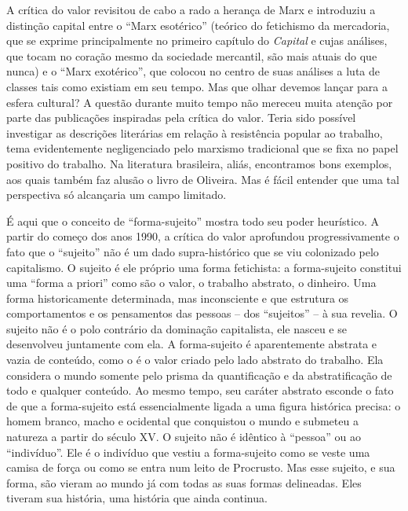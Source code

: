 A crítica do valor revisitou de cabo a rado a herança de Marx e
introduziu a distinção capital entre o ``Marx esotérico'' (teórico do
fetichismo da mercadoria, que se exprime principalmente no primeiro
capítulo do \emph{Capital} e cujas análises, que tocam no coração mesmo
da sociedade mercantil, são mais atuais do que nunca) e o ``Marx
exotérico'', que colocou no centro de suas análises a luta de classes
tais como existiam em seu tempo. Mas que olhar devemos lançar para a
esfera cultural? A questão durante muito tempo não mereceu muita atenção
por parte das publicações inspiradas pela crítica do valor. Teria sido
possível investigar as descrições literárias em relação à resistência
popular ao trabalho, tema evidentemente negligenciado pelo marxismo
tradicional que se fixa no papel positivo do trabalho. Na literatura
brasileira, aliás, encontramos bons exemplos, aos quais também faz
alusão o livro de Oliveira. Mas é fácil entender que uma tal perspectiva
só alcançaria um campo limitado.

É aqui que o conceito de ``forma-sujeito'' mostra todo seu poder
heurístico. A partir do começo dos anos 1990, a crítica do valor
aprofundou progressivamente o fato que o ``sujeito'' não é um dado
supra-histórico que se viu colonizado pelo capitalismo. O sujeito é ele
próprio uma forma fetichista: a forma-sujeito constitui uma ``forma a
priori'' como são o valor, o trabalho abstrato, o dinheiro. Uma forma
historicamente determinada, mas inconsciente e que estrutura os
comportamentos e os pensamentos das pessoas -- dos ``sujeitos'' -- à sua
revelia. O sujeito não é o polo contrário da dominação capitalista, ele
nasceu e se desenvolveu juntamente com ela. A forma-sujeito é
aparentemente abstrata e vazia de conteúdo, como o é o valor criado pelo
lado abstrato do trabalho. Ela considera o mundo somente pelo prisma da
quantificação e da abstratificação de todo e qualquer conteúdo. Ao mesmo
tempo, seu caráter abstrato esconde o fato de que a forma-sujeito está
essencialmente ligada a uma figura histórica precisa: o homem branco,
macho e ocidental que conquistou o mundo e submeteu a natureza a partir
do século XV. O sujeito não é idêntico à ``pessoa'' ou ao ``indivíduo''.
Ele é o indivíduo que vestiu a forma-sujeito como se veste uma camisa de
força ou como se entra num leito de Procrusto. Mas esse sujeito, e sua
forma, são vieram ao mundo já com todas as suas formas delineadas. Eles
tiveram sua história, uma história que ainda continua.

